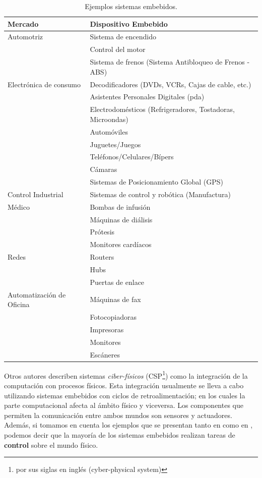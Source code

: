 \begin{table}[h]
\caption{Ejemplos sistemas embebidos.}
    \centering
    \label{tab:ejSistEmbebidos}
    \begin{tabular}{|l|l|}
        \hline
        \textbf{Mercado} & \textbf{Dispositivo Embebido} \\ \hline
        Automotriz & Sistema de encendido \\ 
        & Control del motor \\ 
        & Sistema de frenos (Sistema Antibloqueo de Frenos - ABS) \\ \hline
        Electrónica de consumo & Decodificadores (DVDs, VCRs, Cajas de cable, etc.) \\ 
        & Asistentes Personales Digitales (\gls{pda}) \\ 
        & Electrodomésticos (Refrigeradores, Tostadoras, Microondas) \\ 
        & Automóviles \\ 
        & Juguetes/Juegos \\ 
        & Teléfonos/Celulares/Bípers \\ 
        & Cámaras \\ 
        & Sistemas de Posicionamiento Global (GPS) \\ \hline
        Control Industrial & Sistemas de control y robótica (Manufactura) \\ \hline
        Médico & Bombas de infusión \\ 
        & Máquinas de diálisis \\ 
        & Prótesis \\ 
        & Monitores cardíacos \\ \hline
        Redes & Routers \\ 
        & Hubs \\ 
        & Puertas de enlace \\ \hline
        Automatización de Oficina & Máquinas de fax \\ 
        & Fotocopiadoras \\ 
        & Impresoras \\ 
        & Monitores \\ 
        & Escáneres \\ \hline
    \end{tabular}
\end{table}

Otros autores \cite{lee2017introduction} describen sistemas \textit{ciber-físicos} (\Ac{CSP}\footnote{por sus siglas en inglés (cyber-physical system)}) como la integración de la computación con procesos físicos. Esta integración usualmente se lleva a cabo utilizando sistemas embebidos con ciclos de retroalimentación; en los cuales la parte computacional afecta al ámbito físico y viceversa. Los componentes que permiten la comunicación entre ambos mundos son sensores y actuadores.
Además, si tomamos en cuenta los ejemplos que se presentan tanto en \cite{noergaard2005embedded} como en \cite{lee2017introduction}, podemos decir que la mayoría de los sistemas embebidos realizan tareas de \textbf{control} sobre el mundo físico.

